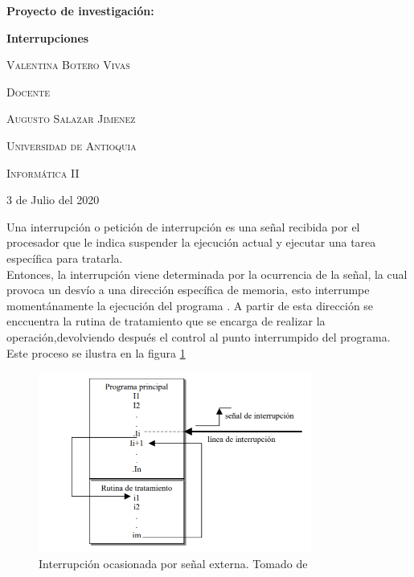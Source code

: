 \documentclass{report}   %
\begin{document}
\begin{titlepage}    %
	\centering
	{\huge\bfseries Proyecto de investigación: \par}
	\vspace{1cm}
	{\huge\bfseries  Interrupciones \par}
    \vspace{3cm}
    {\scshape\large Valentina Botero Vivas \par}
    \vspace{3cm}
      {\scshape\large Docente  \par}
	\vspace{0.5cm}
    {\scshape\large Augusto Salazar Jimenez  \par}
	\vspace{3cm}
	 {\scshape\large Universidad de Antioquia \par}
	\vspace{1cm}
    {\scshape\large Informática II  \par}
	\vspace{1cm}
	{\large 3 de Julio del 2020 \par}
\end{titlepage}


Una interrupción o petición de interrupción es una señal recibida por el procesador que le indica suspender la ejecución actual y ejecutar una tarea específica para tratarla.\\

Entonces, la interrupción viene determinada por la ocurrencia de la señal, la cual provoca un desvío a una dirección específica de memoria, esto interrumpe momentánamente la ejecución del programa . A partir de esta dirección se enccuentra la rutina de tratamiento que se encarga de realizar la operación,devolviendo después el control al punto interrumpido del programa. Este proceso se ilustra en la figura \ref{fig:Interrupción}

\begin{figure}[H]
      \centering
      \captionsetup{justification=centering}
      \includegraphics[width=0.8\textwidth]{1.PNG}
      \caption{Interrupción ocasionada por señal externa. Tomado de \cite{3}}
      \label{fig:Interrupción}
   \end{figure}
\end{document}

